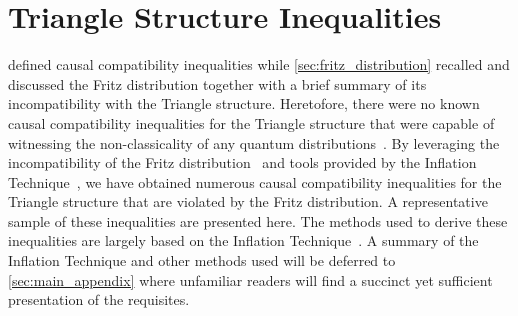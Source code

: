 \documentclass[aps, 10pt, english, twoside, pra, nofootinbib, tightenlines, longbibliography, superscriptaddress]{revtex4-1}
\begin{document}
    \section{Triangle Structure Inequalities}
    \label{sec:found_inequalities}

     defined causal compatibility inequalities while \cref{sec:fritz_distribution} recalled and discussed the Fritz distribution together with a brief summary of its incompatibility with the Triangle structure. Heretofore, there were no known causal compatibility inequalities for the Triangle structure that were capable of witnessing the non-classicality of any quantum distributions~\cite{Inflation}. By leveraging the incompatibility of the Fritz distribution~\cite{Fritz_2012} and tools provided by the Inflation Technique~\cite{Inflation}, we have obtained numerous causal compatibility inequalities for the Triangle structure that are violated by the Fritz distribution. A representative sample of these inequalities are presented here. The methods used to derive these inequalities are largely based on the Inflation Technique~\cite{Inflation}. A summary of the Inflation Technique and other methods used will be deferred to \cref{sec:main_appendix} where unfamiliar readers will find a succinct yet sufficient presentation of the requisites.
\end{document}
